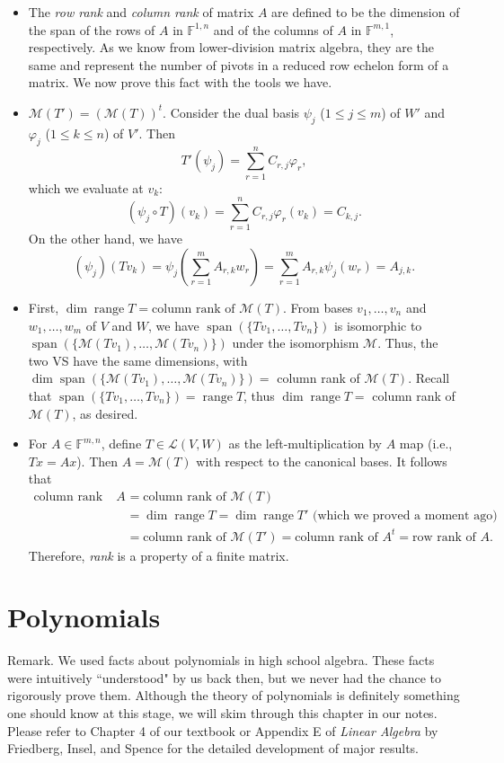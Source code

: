 \documentclass{article}
\newcommand{\F}{\mathbb{F}}
\newcommand{\s}{\operatorname{span}}
\renewcommand{\r}{\operatorname{range}}
\renewcommand{\d}{\dim}
\newcommand{\LVW}{\mathcal{L}(V,W)}
\newcommand{\M}{\mathcal{M}}
\newcommand{\bv}{v_1,\dots,v_n}
\renewcommand{\phi}{\varphi}
\begin{document}
\begin{itemize}
    \item The \textit{row rank} and \textit{column rank} of matrix $A$ are defined to be the dimension of the span of the rows of $A$ in $\F^{1,n}$ and of the columns of $A$ in $\F^{m,1}$, respectively. As we know from lower-division matrix algebra, they are the same and represent the number of pivots in a reduced row echelon form of a matrix. We now prove this fact with the tools we have.
    
    \item $\M(T') = (\M(T))^t$. Consider the dual basis $\psi_j$ ($1 \leq j \leq m$) of $W'$ and $\phi_j$ ($1 \leq k \leq n$) of $V'$. Then $$T'(\psi_j) = \sum_{r=1}^n C_{r,j}\phi_r,$$ which we evaluate at $v_k$: $$(\psi_j \circ T)(v_k) = \sum_{r=1}^n C_{r,j}\phi_r(v_k) = C_{k,j}.$$ On the other hand, we have $$(\psi_j)(Tv_k) = \psi_j(\sum_{r=1}^mA_{r,k}w_r) = \sum_{r=1}^m A_{r,k}\psi_j(w_r) = A_{j,k}.$$
    
    \item First, $\d \r T = \text{column rank of } \M(T)$. From bases $\bv$ and $w_1,\dots,w_m$ of $V$ and $W$, we have $\s(\{Tv_1,\dots,Tv_n\})$ is isomorphic to $\s(\{\M(Tv_1),\dots,\M(Tv_n)\})$ under the isomorphism $\M$. Thus, the two VS have the same dimensions, with $\d \s(\{\M(Tv_1),\dots,\M(Tv_n)\}) = $ column rank of $\M(T)$. Recall that $\s(\{Tv_1,\dots,Tv_n\}) = \r T$, thus $\d \r T = $ column rank of $\M(T)$, as desired.
    
    \item For $A \in \F^{m,n}$, define $T \in \LVW$ as the left-multiplication by $A$ map (i.e., $Tx = Ax$). Then $A = \M(T)$ with respect to the canonical bases. It follows that
    \begin{align*}
        \text{column rank of } A & = \text{column rank of } \M(T) \\
        & = \d \r T = \d \r T' \text{ (which we proved a moment ago)} \\
        & = \text{column rank of } \M(T') = \text{column rank of } A^t
        = \text{row rank of } A.
    \end{align*}
    Therefore, \textit{rank} is a property of a finite matrix.
\end{itemize}

\section{Polynomials}
Remark. We used facts about polynomials in high school algebra. These facts were intuitively ``understood" by us back then, but we never had the chance to rigorously prove them. Although the theory of polynomials is definitely something one should know at this stage, we will skim through this chapter in our notes. Please refer to Chapter 4 of our textbook or Appendix E of \textit{Linear Algebra} by Friedberg, Insel, and Spence for the detailed development of major results.
\end{document}
